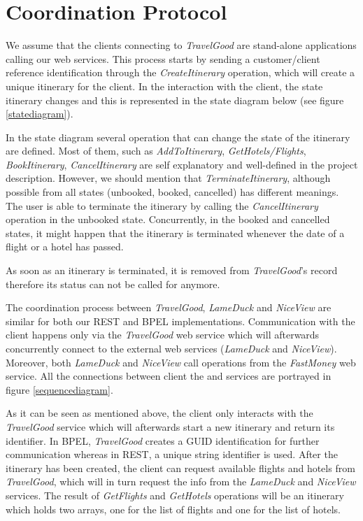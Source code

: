 \section{Coordination Protocol}

We assume that the clients connecting to \textit{TravelGood} are stand-alone applications calling our web services. This process starts by sending a customer/client reference identification through the \textit{CreateItinerary} operation, which will create a unique itinerary for the client. In the interaction with the client, the state itinerary changes and this is represented in the state diagram below (see figure \ref{statediagram}).  

In the state diagram several operation that can change the state of the itinerary are defined. Most of them, such as \textit{AddToItinerary}, \textit{GetHotels/Flights}, \textit{BookItinerary}, \textit{CancelItinerary} are self explanatory and well-defined in the project description. However, we should mention that \textit{TerminateItinerary}, although possible from all states (unbooked, booked, cancelled) has different meanings. The user is able to terminate the itinerary by calling the \textit{CancelItinerary} operation in the unbooked state. Concurrently, in the booked and cancelled states, it might happen that the itinerary is terminated whenever the date of a flight or a hotel has passed. 

As soon as an itinerary is terminated, it is removed from \textit{TravelGood}'s record therefore its status can not be called for anymore. 

The coordination process between \textit{TravelGood}, \textit{LameDuck} and \textit{NiceView} are similar for both our REST and BPEL implementations. Communication with the client happens only via the \textit{TravelGood} web service which will afterwards concurrently connect to the external web services (\textit{LameDuck} and \textit{NiceView}). Moreover, both \textit{LameDuck} and \textit{NiceView} call operations from the \textit{FastMoney} web service. All the connections between client the and services are portrayed in figure \ref{sequencediagram}. 

As it can be seen as mentioned above, the client only interacts with the \textit{TravelGood} service which will afterwards start a new itinerary and return its identifier. In BPEL, \textit{TravelGood} creates a GUID identification for further communication whereas in REST, a unique string identifier is used. After the itinerary has been created, the client can request available flights and hotels from \textit{TravelGood}, which will in turn request the info from the \textit{LameDuck} and \textit{NiceView} services. The result of \textit{GetFlights} and \textit{GetHotels} operations will be an itinerary which holds two arrays, one for the list of flights and one for the list of hotels. 


